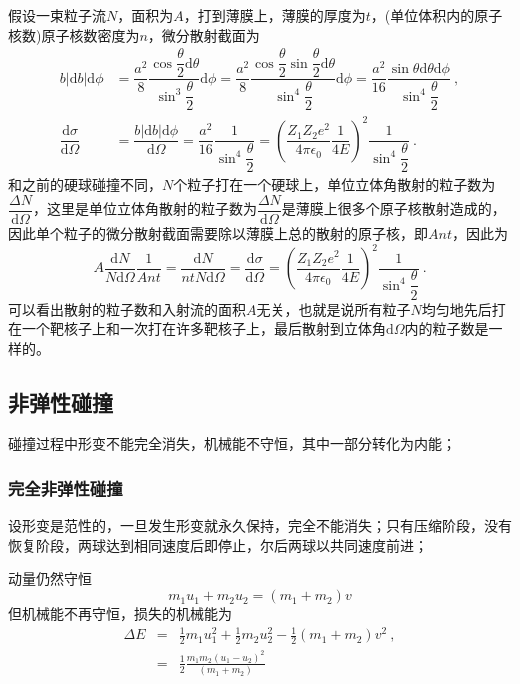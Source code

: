 \documentclass[12pt,a4paper]{article}
\newcommand{\dif}{\mathrm{d}}
\begin{document}
{\begin{equation*}
\end{equation*}
假设一束粒子流$N$，面积为$A$，打到薄膜上，薄膜的厚度为$t$，(单位体积内的原子核数)原子核数密度为$n$，微分散射截面为
\begin{align*}
b |\dif b| \dif \phi &= \dfrac{a^2}{8} \dfrac{\cos \dfrac{\theta}{2} \dif \theta}{\sin^3 \dfrac{\theta}{2} }  \dif \phi = \dfrac{a^2}{8} \dfrac{\cos \dfrac{\theta}{2} \sin \dfrac{\theta}{2} \dif \theta}{\sin^4 \dfrac{\theta}{2} }  \dif \phi = \dfrac{a^2}{16} \dfrac{ \sin  \theta \dif \theta \dif \phi}{\sin^4 \dfrac{\theta}{2} } ~, \\
\dfrac{\dif \sigma}{\dif \Omega} &= \dfrac{b |\dif b| \dif \phi}{\dif \Omega} = \dfrac{a^2}{16} \dfrac{1}{\sin^4 \dfrac{\theta}{2} } = \left( \dfrac{Z_1 Z_2 e^2}{4\pi \epsilon_0} \dfrac{1}{4 E} \right)^2 \dfrac{1}{\sin^4 \dfrac{\theta}{2} } ~.
\end{align*}
和之前的硬球碰撞不同，$N$个粒子打在一个硬球上，单位立体角散射的粒子数为$\dfrac{\Delta N}{\dif \Omega}$，这里是单位立体角散射的粒子数为$\dfrac{\Delta N}{\dif \Omega}$是薄膜上很多个原子核散射造成的，因此单个粒子的微分散射截面需要除以薄膜上总的散射的原子核，即$A n t$，因此为
\begin{equation}
A\dfrac{\dif N}{N\dif \Omega} \dfrac{1}{A nt} = \dfrac{\dif N}{ntN\dif \Omega}  = \dfrac{\dif \sigma}{\dif \Omega} = \left( \dfrac{Z_1 Z_2 e^2}{4\pi \epsilon_0} \dfrac{1}{4 E} \right)^2 \dfrac{1}{\sin^4 \dfrac{\theta}{2} } ~.
\end{equation}
可以看出散射的粒子数和入射流的面积$A$无关，也就是说所有粒子$N$均匀地先后打在一个靶核子上和一次打在许多靶核子上，最后散射到立体角$\dif \Omega$内的粒子数是一样的。
}


\subsection{非弹性碰撞}
碰撞过程中形变不能完全消失，机械能不守恒，其中一部分转化为内能；

\subsubsection{完全非弹性碰撞}
设形变是范性的，一旦发生形变就永久保持，完全不能消失；只有压缩阶段，没有恢复阶段，两球达到相同速度后即停止，尔后两球以共同速度前进；

动量仍然守恒
\begin{equation}
m_1 u_1 + m_2 u_2 = (m_1 +m_2) v
\end{equation}
但机械能不再守恒，损失的机械能为
\begin{eqnarray}
\nonumber \Delta E &=& \frac{1}{2} m_1 u_1^2 +\frac{1}{2} m_2 u_2^2 -\frac{1}{2}(m_1 +m_2)v^2 ~,\\
&=& \frac{1}{2} \frac{m_1 m_2(u_1-u_2)^2}{(m_1 +m_2)}
\end{eqnarray}
\end{document}
